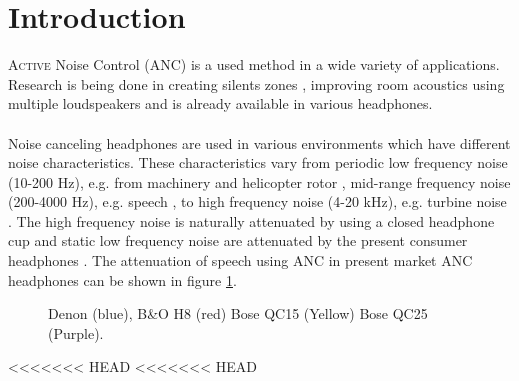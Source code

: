 \section*{Introduction}
\lettrine[lines=2]{A}{ctive} Noise Control 
(ANC) is a used method in a wide variety of applications. Research is being done in creating silents zones \cite{SilentZones}, improving room acoustics using multiple loudspeakers \cite{CAPS} and is already available in various headphones.
\\\\
Noise canceling headphones are used in various environments which have different noise characteristics. These characteristics vary from periodic low frequency noise (10-200 Hz), e.g. from machinery and helicopter rotor \cite{LowFrequency}, mid-range frequency noise (200-4000 Hz), e.g. speech \cite{MidFrequency}, to high frequency noise (4-20 kHz), e.g. turbine noise \cite{LowFrequency}. The high frequency noise is naturally attenuated by using a closed headphone cup \cite{naturalAttenuation} and static low frequency noise are attenuated by the present consumer headphones \cite{naturalAttenuation}. The attenuation of speech using ANC in present market ANC headphones can be shown in figure \ref{fig:ANCcompare}.
\begin{figure}[H]
	\centering
	
	\caption{Denon (blue), B\&O H8 (red) Bose QC15 (Yellow) Bose QC25 (Purple).}
	\label{fig:ANCcompare}
\end{figure}
<<<<<<< HEAD
<<<<<<< HEAD

